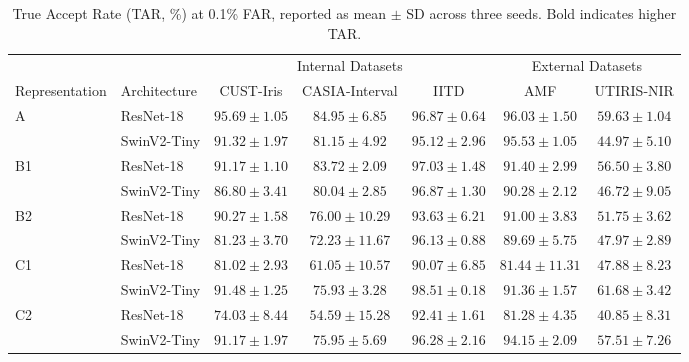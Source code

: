 \begin{table}[!t]
\centering
\caption{True Accept Rate (TAR, \%) at 0.1\% FAR, reported as mean $\pm$ SD across three seeds. Bold indicates higher TAR.}
\label{tab:e2a-matched-tar001}
\begingroup
\small
\setlength{\tabcolsep}{3.2pt}
\renewcommand{\arraystretch}{1.12}
\begin{tabular*}{\textwidth}{@{\extracolsep{\fill}}llccccc@{}}
\toprule
& & \multicolumn{3}{c}{Internal Datasets} & \multicolumn{2}{c}{External Datasets} \\
\cmidrule(lr){3-5}\cmidrule(l){6-7}
Representation & Architecture & CUST-Iris & CASIA-Interval & IITD & AMF & UTIRIS-NIR \\
\midrule
\multirow{2}{*}{A} & ResNet-18 & {\boldmath $95.69 \pm 1.05$} & {\boldmath $84.95 \pm 6.85$} & {\boldmath $96.87 \pm 0.64$} & {\boldmath $96.03 \pm 1.50$} & {\boldmath $59.63 \pm 1.04$} \\
 & SwinV2-Tiny & $91.32 \pm 1.97$ & $81.15 \pm 4.92$ & $95.12 \pm 2.96$ & $95.53 \pm 1.05$ & $44.97 \pm 5.10$ \\
\midrule
\multirow{2}{*}{B1} & ResNet-18 & {\boldmath $91.17 \pm 1.10$} & {\boldmath $83.72 \pm 2.09$} & {\boldmath $97.03 \pm 1.48$} & {\boldmath $91.40 \pm 2.99$} & {\boldmath $56.50 \pm 3.80$} \\
 & SwinV2-Tiny & $86.80 \pm 3.41$ & $80.04 \pm 2.85$ & $96.87 \pm 1.30$ & $90.28 \pm 2.12$ & $46.72 \pm 9.05$ \\
\midrule
\multirow{2}{*}{B2} & ResNet-18 & {\boldmath $90.27 \pm 1.58$} & {\boldmath $76.00 \pm 10.29$} & $93.63 \pm 6.21$ & {\boldmath $91.00 \pm 3.83$} & {\boldmath $51.75 \pm 3.62$} \\
 & SwinV2-Tiny & $81.23 \pm 3.70$ & $72.23 \pm 11.67$ & {\boldmath $96.13 \pm 0.88$} & $89.69 \pm 5.75$ & $47.97 \pm 2.89$ \\
\midrule
\multirow{2}{*}{C1} & ResNet-18 & $81.02 \pm 2.93$ & $61.05 \pm 10.57$ & $90.07 \pm 6.85$ & $81.44 \pm 11.31$ & $47.88 \pm 8.23$ \\
 & SwinV2-Tiny & {\boldmath $91.48 \pm 1.25$} & {\boldmath $75.93 \pm 3.28$} & {\boldmath $98.51 \pm 0.18$} & {\boldmath $91.36 \pm 1.57$} & {\boldmath $61.68 \pm 3.42$} \\
\midrule
\multirow{2}{*}{C2} & ResNet-18 & $74.03 \pm 8.44$ & $54.59 \pm 15.28$ & $92.41 \pm 1.61$ & $81.28 \pm 4.35$ & $40.85 \pm 8.31$ \\
 & SwinV2-Tiny & {\boldmath $91.17 \pm 1.97$} & {\boldmath $75.95 \pm 5.69$} & {\boldmath $96.28 \pm 2.16$} & {\boldmath $94.15 \pm 2.09$} & {\boldmath $57.51 \pm 7.26$} \\
\bottomrule
\end{tabular*}
\par\vspace{3pt}
\endgroup
\end{table}


